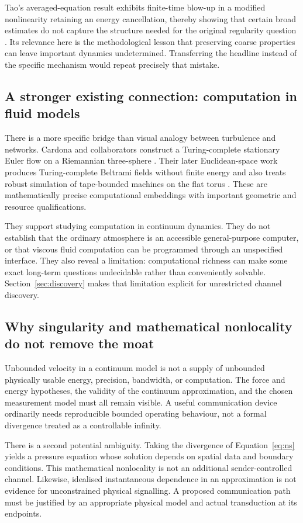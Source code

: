 \documentclass[11pt,a4paper]{article}
\theoremstyle{definition}
\theoremstyle{remark}
\begin{document}
Tao's averaged-equation result exhibits finite-time blow-up in a modified nonlinearity retaining an energy cancellation, thereby showing that certain broad estimates do not capture the structure needed for the original regularity question \citep{tao}. Its relevance here is the methodological lesson that preserving coarse properties can leave important dynamics undetermined. Transferring the headline instead of the specific mechanism would repeat precisely that mistake.

\subsection{A stronger existing connection: computation in fluid models}
There is a more specific bridge than visual analogy between turbulence and networks. Cardona and collaborators construct a Turing-complete stationary Euler flow on a Riemannian three-sphere \citep{cardona3}. Their later Euclidean-space work produces Turing-complete Beltrami fields without finite energy and also treats robust simulation of tape-bounded machines on the flat torus \citep{cardonaeuclid}. These are mathematically precise computational embeddings with important geometric and resource qualifications.

They support studying computation in continuum dynamics. They do not establish that the ordinary atmosphere is an accessible general-purpose computer, or that viscous fluid computation can be programmed through an unspecified interface. They also reveal a limitation: computational richness can make some exact long-term questions undecidable rather than conveniently solvable. Section~\ref{sec:discovery} makes that limitation explicit for unrestricted channel discovery.

\subsection{Why singularity and mathematical nonlocality do not remove the moat}
Unbounded velocity in a continuum model is not a supply of unbounded physically usable energy, precision, bandwidth, or computation. The force and energy hypotheses, the validity of the continuum approximation, and the chosen measurement model must all remain visible. A useful communication device ordinarily needs reproducible bounded operating behaviour, not a formal divergence treated as a controllable infinity.

There is a second potential ambiguity. Taking the divergence of Equation~\eqref{eq:ns} yields a pressure equation whose solution depends on spatial data and boundary conditions. This mathematical nonlocality is not an additional sender-controlled channel. Likewise, idealised instantaneous dependence in an approximation is not evidence for unconstrained physical signalling. A proposed communication path must be justified by an appropriate physical model and actual transduction at its endpoints.
\end{document}
